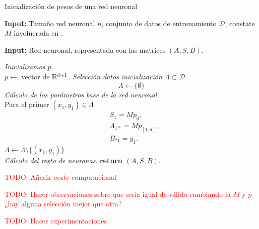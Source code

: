 
\begin{algorithm}[H]
    \caption{Inicialización de pesos de una red neuronal}
    \textbf{Input:} Tamaño red neuronal $n$, conjunto de datos de entrenamiento $\mathcal{D}$, constate $M$ involucrada en .

    \textbf{Input:} Red neuronal, representada con las matrices $(A,S,B)$.
    \hspace*{\algorithmicindent} 
    \begin{algorithmic}[1]
       \STATE \textit{Inicializamos $p$}. \\
       $p \gets$ vector de $\mathbb{R}^{d+1}$. 
       \STATE \textit{Selección datos inicialización
       $\Lambda \subset \mathcal{D}$}. \\
       \begin{equation}
           \Lambda \gets \{ \emptyset \}
       \end{equation}
       \STATE \textit{Cálculo de los parámetros base de la red neuronal.} \\
       
       Para el primer $(x_1, y_1) \in \Lambda$ \\
       \begin{align}
            &S_1 = M p_0, \\
            & A_{1 *} = M p_{[1,d]}, \\
            & B_{* 1} = y_1.
        \end{align}
       $\Lambda \gets \Lambda \setminus \{(x_1, y_1)\} $ \\
       \STATE \textit{Cálculo del resto de neuronas}. 
       \STATE \textbf{return $(A,S,B)$}.
    \end{algorithmic}  
\end{algorithm}

\textcolor{red}{TODO: Añadir coste computacional}

\textcolor{red}{TODO: Hacer observaciones sobre que sería igual de válido cambiando la $M$ y $p$ ¿hay alguna selección mejor que otra? }

\textcolor{red}{TODO: Hacer experimentaciones }